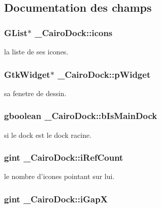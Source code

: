 \subsection{Documentation des champs}
\subsubsection{\setlength{\rightskip}{0pt plus 5cm}GList$\ast$ {\bf \_\-CairoDock::icons}}\label{struct__CairoDock_70a1f2c47eccc9f9180688dc4a3542ee}


la liste de ses icones. 

\subsubsection{\setlength{\rightskip}{0pt plus 5cm}GtkWidget$\ast$ {\bf \_\-CairoDock::pWidget}}\label{struct__CairoDock_9e5f79b421109b2ac456ec394cdc3c24}


sa fenetre de dessin. 

\subsubsection{\setlength{\rightskip}{0pt plus 5cm}gboolean {\bf \_\-CairoDock::bIsMainDock}}\label{struct__CairoDock_dac8dc2d21b68aa1ca0d7e9c5b54faab}


si le dock est le dock racine. 

\subsubsection{\setlength{\rightskip}{0pt plus 5cm}gint {\bf \_\-CairoDock::iRefCount}}\label{struct__CairoDock_c72e0961fae689058dbb526e8a334c65}


le nombre d'icones pointant sur lui. 

\subsubsection{\setlength{\rightskip}{0pt plus 5cm}gint {\bf \_\-CairoDock::iGapX}}\label{struct__CairoDock_9924de20e5ef76f8cad3011d1c883544}


